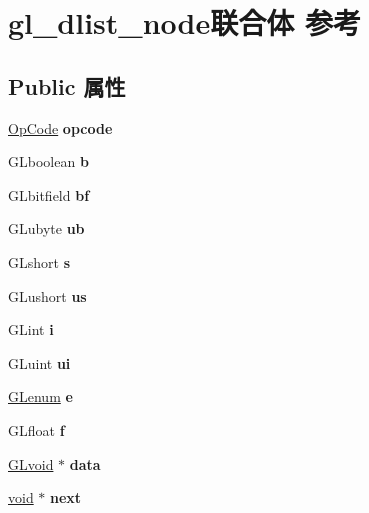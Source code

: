 \hypertarget{uniongl__dlist__node}{}\section{gl\+\_\+dlist\+\_\+node联合体 参考}
\label{uniongl__dlist__node}
\subsection*{Public 属性}
\begin{DoxyCompactItemize}
\item 
\mbox{\label{uniongl__dlist__node_a839076f9f4a5a73180a19c4c571c48f6}} 
\hyperlink{dlist_8c_abeb7dfb0e9e2b3114e240a405d046ea7}{Op\+Code} {\bfseries opcode}
\item 
\mbox{\label{uniongl__dlist__node_a2c2d2627408b37032d41817c8e8c9dc6}} 
G\+Lboolean {\bfseries b}
\item 
\mbox{\label{uniongl__dlist__node_a9f8bd8522b38b3b6fbf1bf62f7098507}} 
G\+Lbitfield {\bfseries bf}
\item 
\mbox{\label{uniongl__dlist__node_af7597c164f6c3a62f9655d9d7d91df3d}} 
G\+Lubyte {\bfseries ub}
\item 
\mbox{\label{uniongl__dlist__node_a3ef8723c81dc5e5f8fe6b97eb389270a}} 
G\+Lshort {\bfseries s}
\item 
\mbox{\label{uniongl__dlist__node_a6a4a9e81ecb0f3619732e6543f6f63eb}} 
G\+Lushort {\bfseries us}
\item 
\mbox{\label{uniongl__dlist__node_aeb29f0cfb438a0ee4b4bd68a9d76d6e6}} 
G\+Lint {\bfseries i}
\item 
\mbox{\label{uniongl__dlist__node_adc97ed2be8b44d9f61ad7b9d8030d10c}} 
G\+Luint {\bfseries ui}
\item 
\mbox{\label{uniongl__dlist__node_a6ecb803fdba0e4654211245be5c9cd1b}} 
\hyperlink{interfacevoid}{G\+Lenum} {\bfseries e}
\item 
\mbox{\label{uniongl__dlist__node_a7fd0f10669b3d9f9f085602aafed49ff}} 
G\+Lfloat {\bfseries f}
\item 
\mbox{\label{uniongl__dlist__node_ac78b160a0228f9f81e13b0140b6c3558}} 
\hyperlink{interfacevoid}{G\+Lvoid} $\ast$ {\bfseries data}
\item 
\mbox{\label{uniongl__dlist__node_aa69a137e2d7faaebebda31cf3708bbc1}} 
\hyperlink{interfacevoid}{void} $\ast$ {\bfseries next}
\end{DoxyCompactItemize}


